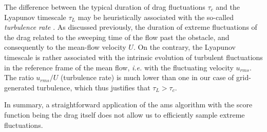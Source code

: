 \documentclass{jfm}
\newcommand{\EL}[1]{{\color{myred}{#1}}}
\begin{document}
The difference between the typical duration of drag fluctuations $\tau_c$ and the Lyapunov timescale $\tau_L$ may be heuristically associated with the so-called \emph{turbulence rate} \EL{\citep{frisch_book}}.
%
As discussed previously, the duration of extreme fluctuations of the drag \EL{is closely} related to the sweeping time of the flow past the obstacle, and consequently to the mean-flow velocity $U$. On the contrary, the Lyapunov timescale is rather associated with the intrinsic evolution of turbulent fluctuations in the reference frame of the mean flow, \textit{i.e.} with the fluctuating velocity $u_{rms}$. The ratio $u_{rms}/U$ (turbulence rate) is much lower than one in our case of grid-generated turbulence, which thus justifies that $\tau_L > \tau_c$.









%
In summary, a straightforward application of the \ac{ams} algorithm with the score function being the drag itself does not allow us to efficiently sample extreme fluctuations.
%
%
%
%
%
\EL{This behaviour is independent of the choice of $N$ and $T_a$. Increasing the size of the initial ensemble, or the duration of each trajectory, can only increase the amplitude of the global maximum reached initially but does not solve the issue of overlapping trajectories.}
% 
\end{document}
